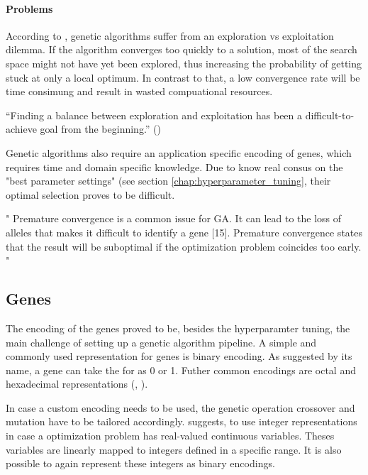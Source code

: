 \paragraph{Problems}
According to \cite{hussain_trade-off_2020}, genetic algorithms suffer from an exploration vs exploitation dilemma. If the algorithm converges too quickly to a solution, most of the search space might not have yet been explored, thus increasing the probability of getting stuck at only a local optimum.
In contrast to that, a low convergence rate will be time consimung and result in wasted compuational resources.

\enquote{Finding a balance between exploration and exploitation has been a difficult-to-achieve goal from the beginning.} (\cite{kacprzyk_parameter_2007})

Genetic algorithms also require an application specific encoding of genes, which requires time and domain specific knowledge. Due to know real consus on the "best parameter settings" (see section \ref{chap:hyperparameter_tuning}, their optimal selection proves to be difficult.

"
Premature convergence is a common issue for GA. It can lead to the loss of alleles that makes it difficult to identify a gene [15]. Premature convergence states that the result will be suboptimal if the optimization problem coincides too early.
"\cite{katoch_review_2021}



\subsection{Genes}
\label{chap:foundation:ga:encoding}

The encoding of the genes proved to be, besides the hyperparamter tuning, the main challenge of setting up a genetic algorithm pipeline.
A simple and commonly used representation for genes is binary encoding. As suggested by its name, a gene can take the for as 0 or 1. Futher common encodings are octal and hexadecimal representations (\cite{srinivas_genetic_1994}, \cite{katoch_review_2021}).

In case a custom encoding needs to be used, the genetic operation crossover and mutation have to be tailored accordingly. \cite{srinivas_genetic_1994} suggests, to use integer representations in case a optimization problem has real-valued continuous variables. Theses variables are linearly mapped to integers defined in a specific range. It is also possible to again represent these integers as binary encodings.

